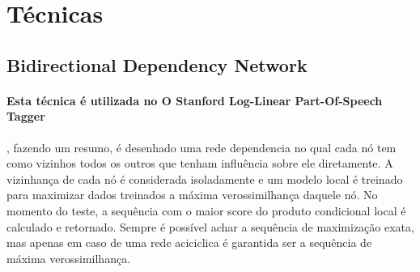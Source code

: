 \documentclass[a4paper, 10pt]{article}
\begin{document}
	\section{Técnicas}
    	\subsection{Bidirectional Dependency Network}
        	\paragraph{Esta técnica é utilizada no O Stanford Log-Linear Part-Of-Speech Tagger}, fazendo um resumo, é desenhado uma rede dependencia no qual cada nó tem como vizinhos todos os outros que tenham influência sobre ele diretamente. A vizinhança de cada nó é considerada isoladamente e um modelo local é treinado para maximizar dados treinados a máxima verossimilhança daquele nó. No momento do teste, a sequência com o maior score do produto condicional local é calculado e retornado. Sempre é possível achar a sequência de maximização exata, mas apenas em caso de uma rede aciciclica é garantida ser a sequência de máxima verossimilhança.
			
\end{document}
